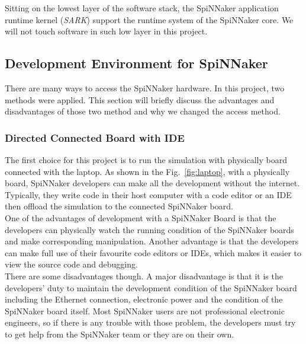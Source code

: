 Sitting on the lowest layer of the software stack, the SpiNNaker application runtime kernel (\textit{SARK}) support the runtime system of the SpiNNaker core. We will not touch software in such low layer in this project.\\

\subsection{Development Environment for SpiNNaker} \label{sec:impl}
There are many ways to access the SpiNNaker hardware. In this project, two methods were applied. This section will briefly discuss the advantages and disadvantages of those two method and why we changed the access method.\\

\subsubsection{Directed Connected Board with IDE}
The first choice for this project is to run the simulation with physically board connected with the laptop. As shown in the Fig.~\ref{fig:laptop}, with a physically board, SpiNNaker developers can make all the development without the internet. Typically, they write code in their host computer with a code editor or an IDE then offload the simulation to the connected SpiNNaker board.\\

One of the advantages of development with a SpiNNaker Board is that the developers can physically watch the running condition of the SpiNNaker boards and make corresponding manipulation. Another advantage is that the developers can make full use of their favourite code editors or IDEs, which makes it easier to view the source code and debugging.\\

There are some disadvantages though. A major disadvantage is that it is the developers' duty to maintain the development condition of the SpiNNaker board including the Ethernet connection, electronic power and the condition of the SpiNNaker board itself. Most SpiNNaker users are not professional electronic engineers, so if there is any trouble with those problem, the developers must try to get help from the SpiNNaker team or they are on their own. \\

